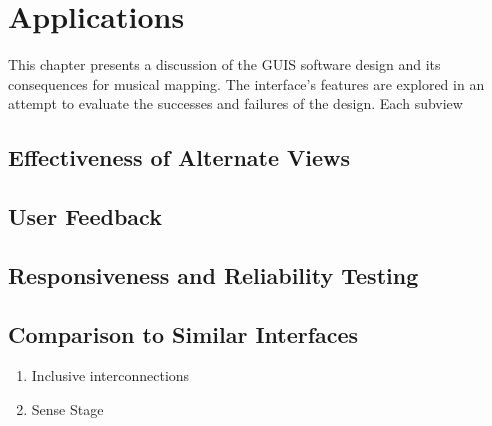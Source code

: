 \chapter{Applications}

This chapter presents a discussion of the GUIS software design and its consequences for musical mapping. The interface's features are explored in an attempt to evaluate the successes and failures of the design. Each subview 

\section{Effectiveness of Alternate Views}



\section{User Feedback}


\section{Responsiveness and Reliability Testing}


\section{Comparison to Similar Interfaces}
\label{sec:similar_interfaces}
	\begin{enumerate}
		\item Inclusive interconnections 
		\item Sense Stage 
	\end{enumerate}

